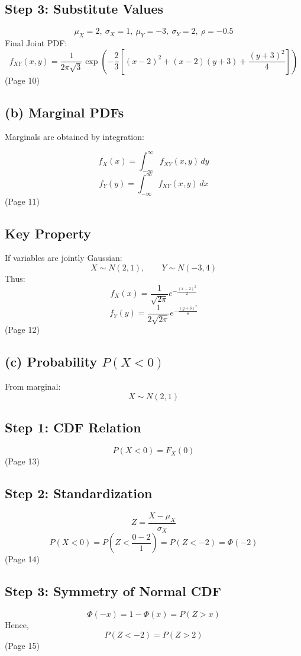 \documentclass{article}
\begin{document}
\subsection*{Step 3: Substitute Values}

\[\mu_X=2,\ \sigma_X=1,\ \mu_Y=-3,\ \sigma_Y=2,\ \rho=-0.5\]
Final Joint PDF:
\[f_{XY}(x,y)=\frac{1}{2\pi\sqrt{3}}\exp\left(-\frac{2}{3}\left[(x-2)^2+(x-2)(y+3)+\frac{(y+3)^2}{4}\right]\right)\]
(Page 10)

\subsection*{(b) Marginal PDFs}

Marginals are obtained by integration:

\[f_X(x)=\int_{-\infty}^{\infty} f_{XY}(x,y)\,dy\]
\[f_Y(y)=\int_{-\infty}^{\infty} f_{XY}(x,y)\,dx\]
(Page 11)

\subsection*{Key Property}

If variables are jointly Gaussian:
\[X\sim N(2,1),\qquad Y\sim N(-3,4)\]
Thus:
\[f_X(x)=\frac{1}{\sqrt{2\pi}}e^{-\frac{(x-2)^2}{2}}\]
\[f_Y(y)=\frac{1}{2\sqrt{2\pi}}e^{-\frac{(y+3)^2}{8}}\]
(Page 12)

\subsection*{(c) Probability $P(X<0)$}

From marginal:
\[X\sim N(2,1)\]

\subsection*{Step 1: CDF Relation}
\[P(X<0)=F_X(0)\]
(Page 13)

\subsection*{Step 2: Standardization}
\[Z=\frac{X-\mu_X}{\sigma_X}\]
\[P(X<0)=P\!\left(Z<\frac{0-2}{1}\right)=P(Z<-2)=\Phi(-2)\]
(Page 14)

\subsection*{Step 3: Symmetry of Normal CDF}
\[\Phi(-x)=1-\Phi(x)=P(Z>x)\]
Hence,
\[P(Z<-2)=P(Z>2)\]
(Page 15)
\end{document}
